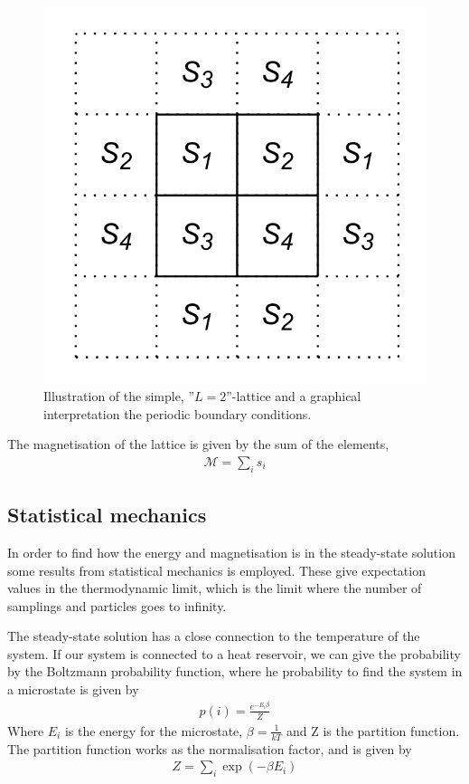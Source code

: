 \documentclass[11pt,a4paper,english]{article}
\numberwithin{equation}{section}
\newcommand{\magM}{\mathcal{M}}
\begin{document}
\begin{figure}[H]
\centering
\includegraphics[scale=0.15]{pics/simple_lattice.png}
\caption{ Illustration of the simple, ''$L=2$''-lattice and a graphical interpretation the periodic boundary conditions.}
\label{fig:spin_neighbours_full}
\end{figure}

The magnetisation of the lattice is given by the sum of the elements,
\begin{gather}
\magM = \sum_i s_i
\label{eq:Msum}
\end{gather}


\subsection{Statistical mechanics}
In order to find how the energy and magnetisation is in the steady-state
solution some results from statistical mechanics is employed. These 
give expectation values in the thermodynamic limit, which is the limit 
where the number of samplings and particles goes to infinity.

The steady-state solution has a close connection to the temperature 
of the system. If our system is connected to a heat reservoir, we can
give the probability by the Boltzmann probability function,
where he probability to find the system in a microstate is given by
\begin{gather}
p(i) = \frac{e^{-E_i\beta}}{Z}
\end{gather}
Where $E_i$ is the energy for the microstate, $\beta = \frac{1}{kT}$ 
and Z is the partition function. The partition function works as the 
normalisation factor, and is given by
\begin{gather}
Z = \sum_i \exp(-\beta E_i)
\end{gather}
\end{document}
